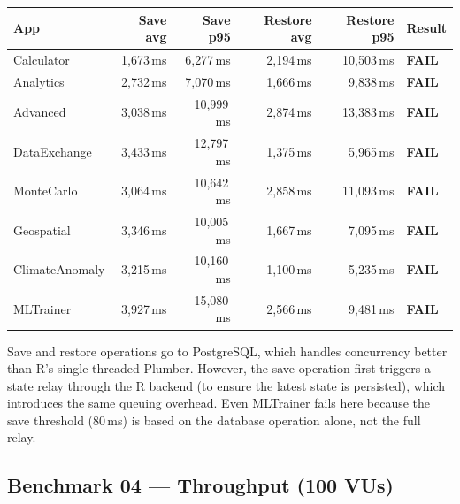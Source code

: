 \documentclass[11pt,a4paper]{article}
\begin{document}
\begin{center}
\begin{tabular}{lrrrrl}
\toprule
\textbf{App} & \textbf{Save avg} & \textbf{Save p95} & \textbf{Restore avg} & \textbf{Restore p95} & \textbf{Result} \\
\midrule
Calculator     & 1,673\,ms &  6,277\,ms & 2,194\,ms & 10,503\,ms & \textbf{FAIL} \\
Analytics      & 2,732\,ms &  7,070\,ms & 1,666\,ms &  9,838\,ms & \textbf{FAIL} \\
Advanced       & 3,038\,ms & 10,999\,ms & 2,874\,ms & 13,383\,ms & \textbf{FAIL} \\
DataExchange   & 3,433\,ms & 12,797\,ms & 1,375\,ms &  5,965\,ms & \textbf{FAIL} \\
MonteCarlo     & 3,064\,ms & 10,642\,ms & 2,858\,ms & 11,093\,ms & \textbf{FAIL} \\
Geospatial     & 3,346\,ms & 10,005\,ms & 1,667\,ms &  7,095\,ms & \textbf{FAIL} \\
ClimateAnomaly & 3,215\,ms & 10,160\,ms & 1,100\,ms &  5,235\,ms & \textbf{FAIL} \\
MLTrainer      & 3,927\,ms & 15,080\,ms & 2,566\,ms &  9,481\,ms & \textbf{FAIL} \\
\bottomrule
\end{tabular}
\end{center}

\noindent Save and restore operations go to PostgreSQL, which handles
concurrency better than R's single-threaded Plumber. However, the
save operation first triggers a state relay through the R backend
(to ensure the latest state is persisted), which introduces the same
queuing overhead. Even MLTrainer fails here because the save threshold
(80\,ms) is based on the database operation alone, not the full relay.

\subsection{Benchmark 04 — Throughput (100 VUs)}
\end{document}
